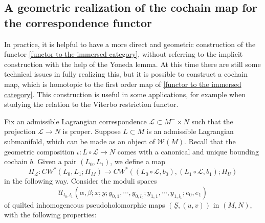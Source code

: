 \documentclass{amsart}
\numberwithin{equation}{section}
\numberwithin{figure}{section}
\begin{document}
\subsection{A geometric realization of the cochain map for the correspondence functor} \label{section: a different geometric realization of the correspondence functor}
	In practice, it is helpful to have a more direct and geometric construction of the functor \eqref{functor to the immersed category}, without referring to the implicit construction with the help of the Yoneda lemma. At this time there are still some technical issues in fully realizing this, but it is possible to construct a cochain map, which is homotopic to the first order map of \eqref{functor to the immersed category}. This construction is useful in some applications, for example when studying the relation to the Viterbo restriction functor. \par
	Fix an admissible Lagrangian correspondence $\mathcal{L} \subset M^{-} \times N$ such that the projection $\mathcal{L} \to N$ is proper. Suppose $L \subset M$ is an admissible Lagrangian submanifold, which can be made as an object of $\mathcal{W}(M)$. Recall that the geometric composition $\iota: L \circ \mathcal{L} \to N$ comes with a canonical and unique bounding cochain $b$. 
Given a pair $(L_{0}, L_{1})$, we define a map
\begin{equation} \label{a different realization of the correspondence functor}
\Pi_{\mathcal{L}}: CW^{*}(L_{0}, L_{1}; H_{M}) \to CW^{*}((L_{0} \circ \mathcal{L}, b_{0}), (L_{1} \circ \mathcal{L}, b_{1}); H_{U})
\end{equation}
in the following way. Consider the moduli spaces
\begin{equation*}
\mathcal{U}_{l_{0}, l_{1}}(\alpha, \beta; x; y; y_{0, 1}, \cdots, y_{0, l_{0}}; y_{1, 1}, \cdots, y_{1, l_{1}}; e_{0}, e_{1})
\end{equation*}
of quilted inhomogeneous pseudoholomorphic maps $(\underline{S}, (u, v))$ in $(M, N)$, with the following properties:
\end{document}
